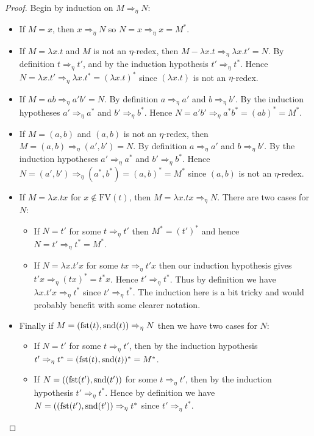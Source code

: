 \begin{proof}
    Begin by induction on $M \Rightarrow_\eta N$:
    \begin{itemize}
        \item If $M = x$, then $x \Rightarrow_\eta N$ so $N  = x \Rightarrow_\eta x = M^*$.
        \item If $M = \lambda x . t$ and $M$ is not an $\eta$-redex, then $M - \lambda x . t \Rightarrow_\eta \lambda x . t' = N$. By definition $t \Rightarrow_\eta t'$, and by the induction hypothesis $t' \Rightarrow_\eta t^*$. Hence $N = \lambda x . t' \Rightarrow_\eta \lambda x . t^* = (\lambda x. t)^*$ since $(\lambda x . t)$ is not an $\eta$-redex.
        \item If $M = a b \Rightarrow_\eta a' b' = N$. By definition $a \Rightarrow_\eta a'$ and $b \Rightarrow_\eta b'$. By the induction hypotheses $a' \Rightarrow_\eta a^*$ and $b' \Rightarrow_\eta b^*$. Hence $N = a'b' \Rightarrow_\eta a^* b^* = (a b)^* = M^*$.
        \item If $M = (a, b)$ and $(a, b)$ is not an $\eta$-redex, then $M = (a, b) \Rightarrow_\eta (a', b') = N$. By definition $a \Rightarrow_\eta a'$ and $b \Rightarrow_\eta b'$. By the induction hypotheses $a' \Rightarrow_\eta a^*$ and $b' \Rightarrow_\eta b^*$. Hence $N = (a',b') \Rightarrow_\eta (a^*, b^*) = (a, b)^* = M^*$ since $(a, b)$ is not an $\eta$-redex.
        \item If $M = \lambda x . t x$ for $x \not\in \mathrm{FV}(t)$, then $M = \lambda x . t x \Rightarrow_\eta N$. There are two cases for $N$:
        \begin{itemize}
            \item If $N = t'$ for some $t \Rightarrow_\eta t'$ then $M^* = (t')^*$ and hence $N = t' \Rightarrow_\eta t^* = M^*$.
            \item If $N = \lambda x . t' x$ for some $t x\Rightarrow_\eta t' x$ then our induction hypothesis gives $t' x \Rightarrow_\eta (t x)^* = t^* x$. Hence $t' \Rightarrow_\eta t^*$. Thus by definition we have $\lambda x . t' x \Rightarrow_\eta t^*$ since $t' \Rightarrow_\eta t^*$. The induction here is a bit tricky and would probably benefit with some clearer notation. 
        \end{itemize}
        \item Finally if $M =(\mathrm{fst}(t), \mathrm{snd}(t)) \Rightarrow_\eta N$ then we have two cases for $N$:
        \begin{itemize}
            \item If $N = t'$ for some $t \Rightarrow_\eta t'$, then by the induction hypothesis $t' \Rightarrow_\eta t^* = (\mathrm{fst}(t), \mathrm{snd}(t))^* = M^*$.
            \item If $N = ((\mathrm{fst}(t'), \mathrm{snd}(t'))$ for some $t \Rightarrow_\eta t'$, then by the induction hypothesis $t' \Rightarrow_\eta t^*$. Hence by definition we have $N = ((\mathrm{fst}(t'), \mathrm{snd}(t')) \Rightarrow_\eta t^*$ since $t' \Rightarrow_\eta t^*$.
        \end{itemize}
    \end{itemize}
\end{proof}


